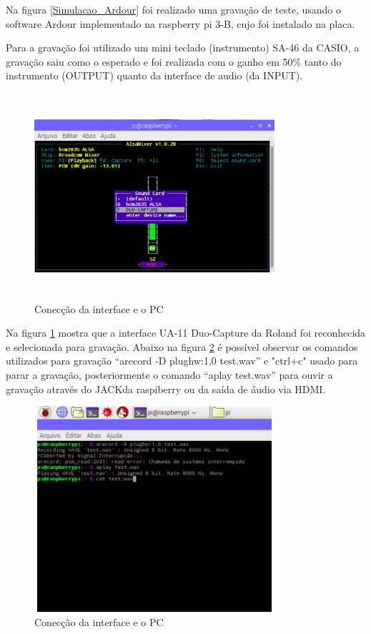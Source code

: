 \documentclass[conference]{IEEEtran}
\begin{document}
Na figura \ref{Simulacao_Ardour} foi realizado uma gravação de teste, usando o software Ardour implementado na raspberry pi 3-B, cujo foi instalado na placa.

Para a gravação foi utilizado um mini teclado (instrumento) SA-46 da CASIO, a gravação saiu como o esperado e foi realizada com o ganho em 50\% tanto do instrumento (OUTPUT) quanto da interface de audio (da INPUT).

\begin{figure}[!htb]
\centering
\includegraphics[width=3.5in, height=3in]{Imagens/Alsamixer}
\caption{Conecção da interface e o PC} 
\label{Alsamixer}
\end{figure}

Na figura \ref{Alsamixer} mostra que a interface UA-11 Duo-Capture da Roland foi reconhecida e selecionada para gravação. Abaixo na figura \ref{amixer} é possível observar os comandos utilizados para gravação “arecord -D plughw:1,0 test.wav” e "ctrl+c" usado para parar a gravação, posteriormente o comando “aplay test.wav” para ouvir a gravação através do JACKda raspiberry ou da saída de áudio via HDMI.
\begin{figure}[!htb]
\centering
\includegraphics[width=3.5in, height=3in]{Imagens/amixer}
\caption{Conecção da interface e o PC} 
\label{amixer}
\end{figure}
\\
\end{document}
